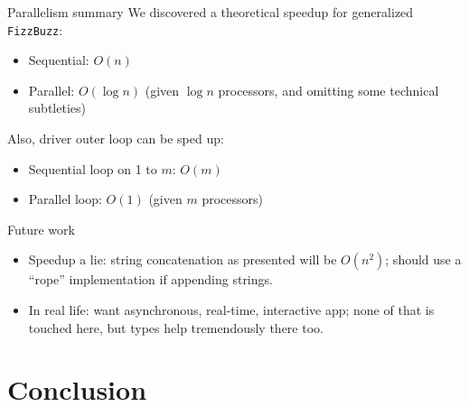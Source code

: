 \begin{frame}{Parallelism summary}
  We discovered a theoretical speedup for generalized \texttt{FizzBuzz}:
  \begin{itemize}
  \item Sequential: $O(n)$
  \item Parallel: $O(\log n)$ (given $\log n$ processors, and omitting some technical subtleties)
  \end{itemize}

  Also, driver outer loop can be sped up:
  \begin{itemize}
  \item Sequential loop on 1 to $m$: $O(m)$
  \item Parallel loop: $O(1)$ (given $m$ processors)
  \end{itemize}
\end{frame}

\begin{frame}{Future work}
  \begin{itemize}
  \item Speedup a lie: string concatenation as presented will be $O(n^2)$; should use a ``rope'' implementation if appending strings.
  \item In real life: want asynchronous, real-time, interactive app; none of that is touched here, but types help tremendously there too.
  \end{itemize}
\end{frame}

\section{Conclusion}

